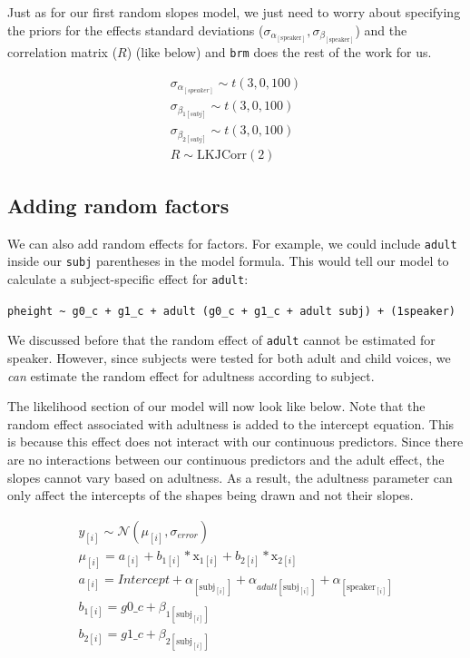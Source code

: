 \documentclass[
]{book}
\begin{document}
Just as for our first random slopes model, we just need to worry about specifying the priors for the effects standard deviations (\(\sigma_{\alpha_{[\mathrm{speaker}]}}, \sigma_{\beta_{[\mathrm{speaker}]}}\)) and the correlation matrix (\(R\)) (like below) and \texttt{brm} does the rest of the work for us.

\begin{equation}
\begin{split}
\sigma_{\alpha_{[speaker]}} \sim t(3, 0, 100) \\ 
\sigma_{\beta_{1[subj]}} \sim t(3, 0, 100) \\ 
\sigma_{\beta_{2[subj]}} \sim t(3, 0, 100) \\ 
R \sim \mathrm{LKJCorr} (2)
\end{split}
\label{eq:614}
\end{equation}

\hypertarget{adding-random-factors}{%
\subsection{Adding random factors}\label{adding-random-factors}}

We can also add random effects for factors. For example, we could include \texttt{adult} inside our \texttt{subj} parentheses in the model formula. This would tell our model to calculate a subject-specific effect for \texttt{adult}:

\texttt{pheight\ \textasciitilde{}\ g0\_c\ +\ g1\_c\ +\ adult\ (g0\_c\ +\ g1\_c\ +\ adult\ \textbar{}subj)\ +\ (1\textbar{}speaker)}

We discussed before that the random effect of \texttt{adult} cannot be estimated for speaker. However, since subjects were tested for both adult and child voices, we \emph{can} estimate the random effect for adultness according to subject.

The likelihood section of our model will now look like below. Note that the random effect associated with adultness is added to the intercept equation. This is because this effect does not interact with our continuous predictors. Since there are no interactions between our continuous predictors and the adult effect, the slopes cannot vary based on adultness. As a result, the adultness parameter can only affect the intercepts of the shapes being drawn and not their slopes.

\begin{equation}
\begin{split}
y_{[i]} \sim \mathcal{N}(\mu_{[i]},\sigma_{error}) \\
\mu_{[i]} = a_{[i]} + b_{1[i]} * \mathrm{x}_{1[i]} + b_{2[i]} * \mathrm{x}_{2[i]}  \\ 
a_{[i]} = Intercept + \alpha_{[\mathrm{subj}_{[i]}]} + \alpha_{adult[\mathrm{subj}_{[i]}]} + \alpha_{[\mathrm{speaker}_{[i]}]}  \\
b_{1[i]} =  g0\_c + \beta_{1{[\mathrm{subj}_{[i]}]}} \\ 
b_{2[i]} =  g1\_c + \beta_{2{[\mathrm{subj}_{[i]}]}} \\ \\
\end{split}
\label{eq:614b}
\end{equation}
\end{document}
